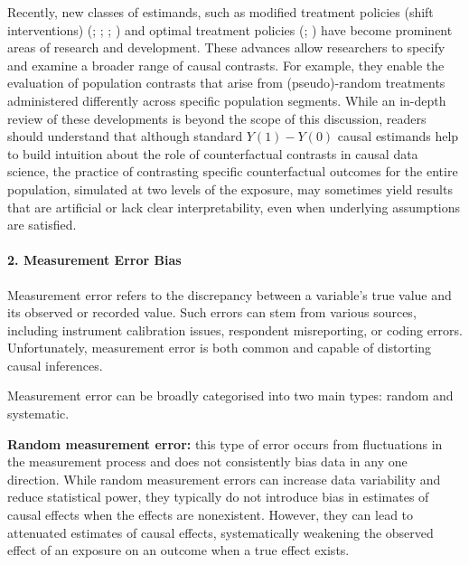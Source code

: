 \documentclass[
  singlecolumn,
  9pt]{article}
\let\oldparagraph\paragraph
\renewcommand{\paragraph}[1]{\oldparagraph{#1}\mbox{}}
\begin{document}
Recently, new classes of estimands, such as modified treatment policies
(shift interventions) (; ;
;
) and optimal
treatment policies (;
) have become
prominent areas of research and development. These advances allow
researchers to specify and examine a broader range of causal contrasts.
For example, they enable the evaluation of population contrasts that
arise from (pseudo)-random treatments administered differently across
specific population segments. While an in-depth review of these
developments is beyond the scope of this discussion, readers should
understand that although standard \(Y(1) - Y(0)\) causal estimands help
to build intuition about the role of counterfactual contrasts in causal
data science, the practice of contrasting specific counterfactual
outcomes for the entire population, simulated at two levels of the
exposure, may sometimes yield results that are artificial or lack clear
interpretability, even when underlying assumptions are satisfied.

\paragraph{2. Measurement Error Bias}\label{measurement-error-bias}

Measurement error refers to the discrepancy between a variable's true
value and its observed or recorded value. Such errors can stem from
various sources, including instrument calibration issues, respondent
misreporting, or coding errors. Unfortunately, measurement error is both
common and capable of distorting causal inferences.

Measurement error can be broadly categorised into two main types: random
and systematic.

\textbf{Random measurement error:} this type of error occurs from
fluctuations in the measurement process and does not consistently bias
data in any one direction. While random measurement errors can increase
data variability and reduce statistical power, they typically do not
introduce bias in estimates of causal effects when the effects are
nonexistent. However, they can lead to attenuated estimates of causal
effects, systematically weakening the observed effect of an exposure on
an outcome when a true effect exists.
\end{document}
